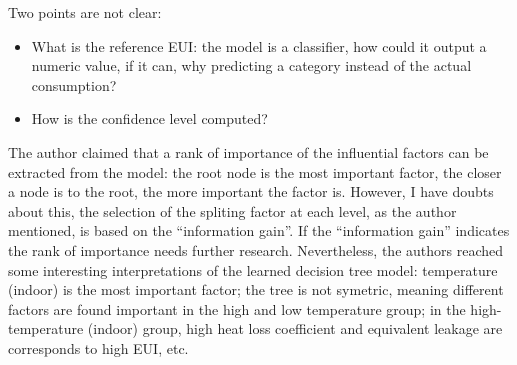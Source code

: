 \documentclass[12pt]{article}
\begin{document}
Two points are not clear:
\begin{itemize}
\item What is the reference EUI: the model is a classifier, how could it
output a numeric value, if it can, why predicting a category instead
of the actual consumption?
\item How is the confidence level computed?
\end{itemize}

The author claimed that a rank of importance of the influential
factors can be extracted from the model: the root node is the most
important factor, the closer a node is to the root, the more important
the factor is. However, I have doubts about this, the selection of the
spliting factor at each level, as the author mentioned, is based on
the ``information gain''. If the ``information gain'' indicates the
rank of importance needs further research. Nevertheless, the authors
reached some interesting interpretations of the learned decision tree
model: temperature (indoor) is the most important factor; the tree is
not symetric, meaning different factors are found important in the
high and low temperature group; in the high-temperature (indoor)
group, high heat loss coefficient and equivalent leakage are
corresponds to high EUI, etc.
\end{document}

